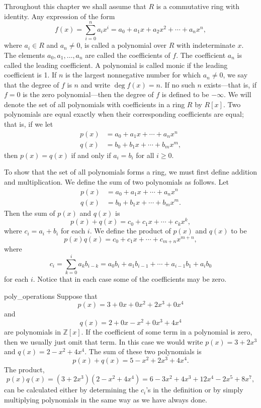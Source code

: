 Throughout this chapter we shall assume that $R$ is a commutative ring with identity.  Any expression of the form 
\[
f(x) = \sum^{n}_{i=0} a_i x^i = a_0 + a_1 x +a_2 x^2 + \cdots + a_n x^n, 
\]
where $a_i \in R$ and $a_n \neq 0$, is called a {\bfi polynomial over $R$} with {\bfi indeterminate} $x$.  The elements $a_0, a_1, \ldots, a_n$ are called the {\bfi coefficients\/} of $f$.  The coefficient $a_n$ is called the {\bfi leading coefficient}.  A polynomial is called {\bfi monic\/} if the leading coefficient is 1.  If $n$ is the largest nonnegative number for which $a_n \neq 0$, we say that the {\bfi degree\/} of $f$ is $n$ and write $\deg f(x) = n$\label{polydegree}.  If no such $n$ exists---that is, if $f=0$ is the zero polynomial---then the degree of $f$ is defined to be $-\infty$.  We will denote the set of all polynomials with coefficients in a ring $R$ by $R[x]$\label{polynomialring}.  Two polynomials are equal exactly when their corresponding coefficients are equal; that is, if we let    
\begin{align*}
p(x) & = a_0 + a_1 x + \cdots + a_n x^n \\
q(x) & = b_0 + b_1 x + \cdots + b_m x^m,
\end{align*}
then $p(x) = q(x)$ if and only if $a_i = b_i$ for all $i \geq 0$.

To show that the set of all polynomials forms a ring, we must first define addition and multiplication.  We define the sum of two polynomials as follows.  Let
\begin{align*}
p(x) & = a_0 + a_1 x + \cdots + a_n x^n \\
q(x) & = b_0 + b_1 x + \cdots + b_m x^m.
\end{align*}
Then the sum of $p(x)$ and $q(x)$ is
\[
p(x) + q(x) = c_0 + c_1 x + \cdots + c_k x^k,
\]
where $c_i = a_i + b_i$ for each $i$.  We define the product of $p(x)$ and $q(x)$ to be 
\[
p(x) q(x) = c_0 + c_1 x + \cdots + c_{m + n} x^{m + n},
\]
where
\[
c_i = \sum_{k = 0}^i a_k b_{i - k} = a_0  b_i + a_1 b_{i -1} + \cdots + a_{i -1} b _1 + a_i b_0
\]
for each $i$.  Notice that in each case some of the coefficients may be zero. 

\begin{example}{poly_operations}
Suppose that
\[
p(x) = 3 + 0 x + 0 x^2 + 2 x^3 + 0 x^4
\]
and
\[
q(x) = 2 + 0 x - x^2 + 0 x^3 + 4 x^4
\]
are polynomials in ${\mathbb Z}[x]$.  If the coefficient of some term in a polynomial is zero, then we usually just omit that term.  In this case we  would write $p(x) =  3 + 2 x^3$ and $q(x) = 2 - x^2 + 4 x^4$.  The sum of these two polynomials is
\[
p(x) + q(x)= 5 - x^2 + 2 x^3 + 4 x^4.
\]
The product,
\[
p(x) q(x) = (3 + 2 x^3)( 2 - x^2 + 4 x^4 ) =  6 - 3x^2 + 4 x^3 + 12 x^4  - 2 x^5 + 8 x^7,
\]
can be calculated either by determining the $c_i$'s in the definition or by simply multiplying polynomials in the same way as we have
always done.
\end{example}

